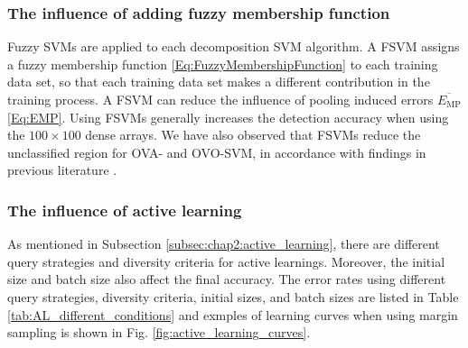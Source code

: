 \subsubsection{The influence of adding fuzzy membership function}
Fuzzy SVMs are applied to each decomposition SVM algorithm. 
A FSVM assigns a fuzzy membership function \eqref{Eq:FuzzyMembershipFunction} to each training data set, so that each training data set makes a different contribution in the training process. A FSVM can reduce the influence of pooling induced errors  $\overline{E_{\text{MP}}}$ \eqref{Eq:EMP}.  
Using FSVMs generally increases the detection accuracy when using the $100 \times 100$ dense arrays. We have also observed that FSVMs reduce the unclassified region for OVA- and OVO-SVM, in accordance with findings in previous literature \cite{abe2002fuzzy, inoue2001fuzzy}. 



\subsubsection{The influence of active learning}
As mentioned in Subsection \ref{subsec:chap2:active_learning}, there are different query strategies and diversity criteria for active learnings. Moreover, the initial size and batch size also affect the final accuracy. The error rates using different query strategies, diversity criteria, initial sizes, and batch sizes are listed in Table \ref{tab:AL_different_conditions} and exmples of learning curves when using margin sampling is shown in Fig. \ref{fig:active_learning_curves}.



